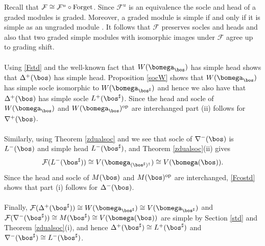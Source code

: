 \documentclass[11pt,reqno]{amsart}
\theoremstyle{definition} \newtheorem*{defn}{Definition}
\theoremstyle{definition}
\newenvironment{pf}{\proof}{\endproof}
\numberwithin{equation}{section}
\def\op{\operatorname{op}}
\begin{document}
\begin{pf} Recall that $\mathcal F\cong\mathcal F^u\circ{\rm Forget}$. Since  $\mathcal F^u$ is an equivalence the  socle and head  of a graded modules is graded. Moreover, a graded module is simple if and only if it is simple as an ungraded module \cite[Section 2.5]{KL09}.  It follows that $\mathcal F$ preserves socles and heads and also  that two graded simple modules with isomorphic images under $\mathcal F$ agree up to grading shift. \\\\
Using \eqref{Fstd} and the well-known  fact that $W(\bomega_\bos)$
has simple head shows that $\Delta^+(\bos)$ has simple head. Proposition \ref{socW} shows that $W(\bomega_{\bos})$ has simple socle isomorphic to $W(\bomega_{\bos^\sharp})$ and hence we also have that $\Delta^+(\bos)$ has simple socle $L^+(\bos^\sharp)$. Since the head and socle of $W(\bomega_\bos)$ and $W(\bomega_{\bos})^{\op}$ are interchanged part (ii) follows for $\nabla^+(\bos)$.
\\\\
Similarly, using Theorem \ref{zdualsoc} and  we see that socle of $\nabla^-(\bos)$ is $L^-(\bos)$ and simple head $L^-(\bos^\sharp)$, and
Theorem \ref{zdualsoc}(ii) gives
$$\mathcal F(L^-(\bos^\sharp))\cong V(\bomega_{(\bos^\sharp)^\dagger})\cong V(\bomega(\bos)).$$
Since the head and socle of $M(\bos)$ and $M(\bos)^{\op}$ are interchanged, \eqref{Fcostd} shows that part (i) follows for
$\Delta^-(\bos)$.
\\\\
Finally, $\mathcal F(\Delta^+(\bos^\sharp))\cong W(\bomega_{\bos^\sharp})\cong V(\bomega_{\bos^\sharp})$ and
$\mathcal F(\nabla^-(\bos^\sharp))\cong M(\bos^\sharp)\cong V(\bomega(\bos))$ are simple by Section \ref{std} and
Theorem \ref{zdualsoc}(i), and hence $\Delta^+(\bos^\sharp)\cong L^+(\bos^\sharp)$ and $\nabla^-(\bos^\sharp)\cong L^-(\bos^\sharp)$. 


\end{pf}
\end{document}
